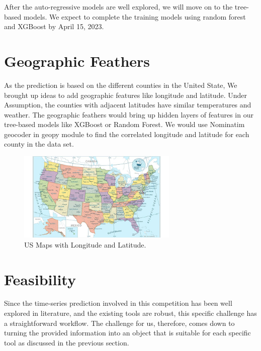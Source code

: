 \documentclass[prl,aps,superscriptaddress,twocolumn,10pt,nolongbibliography]{revtex4-2}
\begin{document}
After the auto-regressive models are well explored, we will move on to the tree-based models. 
We expect to complete the training models using random forest and XGBoost by April 15, 2023. 


\section{Geographic Feathers}
As the prediction is based on the different counties in the United State, We brought up ideas to add geographic features like longitude and latitude. Under Assumption, the counties with adjacent latitudes have similar temperatures and weather. The geographic feathers would bring up hidden layers of features in our tree-based models like XGBoost or Random Forest. We would use Nominatim geocoder in geopy module to find the correlated longitude and latitude for each county in the data set.
\begin{figure}
\includegraphics[width=3in]{figs/contractor-licensing-requirements-by-state.jpg}
\caption{\label{fig:activity}
US Maps with Longitude and Latitude.
}
\end{figure}

\section{Feasibility}
Since the time-series prediction involved in this competition has been well explored in literature, and the existing tools are robust, this specific challenge has a straightforward workflow. 
The challenge for us, therefore, comes down to turning the provided information into an object that is suitable for each specific tool as discussed in the previous section.
\end{document}
